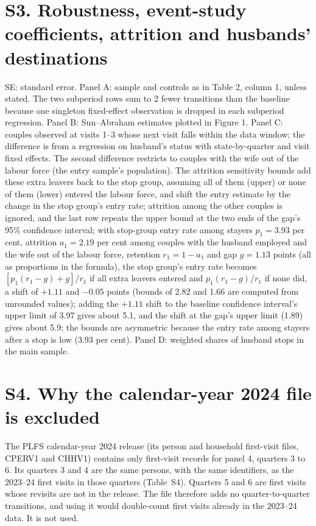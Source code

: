 \section*{S3. Robustness, event-study coefficients, attrition and husbands' destinations}
\begin{table}[htbp]\centering\caption*{Table S3: Robustness and supporting estimates (percentage points)}\scriptsize
\par\vspace{4pt}\begin{minipage}{0.95\linewidth}\footnotesize SE: standard error. Panel A: sample and controls as in Table 2, column 1, unless stated. The two subperiod rows sum to 2 fewer transitions than the baseline because one singleton fixed-effect observation is dropped in each subperiod regression. Panel B: Sun--Abraham estimates plotted in Figure 1. Panel C: couples observed at visits 1--3 whose next visit falls within the data window; the difference is from a regression on husband's status with state-by-quarter and visit fixed effects. The second difference restricts to couples with the wife out of the labour force (the entry sample's population). The attrition sensitivity bounds add these extra leavers back to the stop group, assuming all of them (upper) or none of them (lower) entered the labour force, and shift the entry estimate by the change in the stop group's entry rate; attrition among the other couples is ignored, and the last row repeats the upper bound at the two ends of the gap's 95\% confidence interval; with stop-group entry rate among stayers $p_1=3.93$ per cent, attrition $a_1=2.19$ per cent among couples with the husband employed and the wife out of the labour force, retention $r_1=1-a_1$ and gap $g=1.13$ points (all as proportions in the formula), the stop group's entry rate becomes $[p_1(r_1-g)+g]/r_1$ if all extra leavers entered and $p_1(r_1-g)/r_1$ if none did, a shift of $+1.11$ and $-0.05$ points (bounds of 2.82 and 1.66 are computed from unrounded values); adding the $+1.11$ shift to the baseline confidence interval's upper limit of 3.97 gives about 5.1, and the shift at the gap's upper limit (1.89) gives about 5.9; the bounds are asymmetric because the entry rate among stayers after a stop is low (3.93 per cent). Panel D: weighted shares of husband stops in the main sample.\end{minipage}
\end{table}

\section*{S4. Why the calendar-year 2024 file is excluded}
The PLFS calendar-year 2024 release (its person and household first-visit files, CPERV1 and CHHV1) contains only first-visit records for panel 4, quarters 3 to 6. Its quarters 3 and 4 are the same persons, with the same identifiers, as the 2023--24 first visits in those quarters (Table~S4). Quarters 5 and 6 are first visits whose revisits are not in the release. The file therefore adds no quarter-to-quarter transitions, and using it would double-count first visits already in the 2023--24 data. It is not used.

